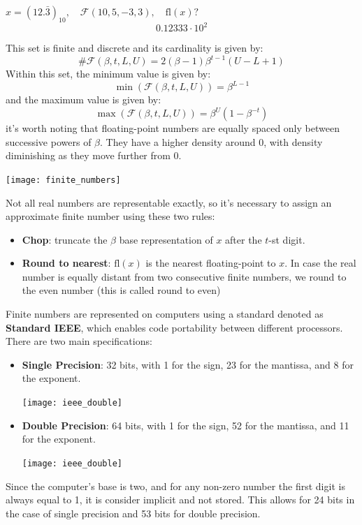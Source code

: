 \documentclass{article}
\begin{document}
\begin{example}
    $x=(12.\bar{3})_{10},\quad\mathcal{F}(10,5,-3,3),\quad \text{fl}(x)?$
    $$0.12333\cdot10^2$$
\end{example}
This set is finite and discrete and its cardinality is given by:
$$\#\mathcal{F}(\beta,t,L,U)=2(\beta-1)\beta^{t-1}(U-L+1)$$
Within this set, the minimum value is given by:
$$\min(\mathcal{F}(\beta,t,L,U))=\beta^{L-1}$$
and the maximum value is given by:
$$\max(\mathcal{F}(\beta,t,L,U))=\beta^U(1-\beta^{-t})$$
it's worth noting that floating-point numbers are equally spaced only between
successive powers of $\beta$. They have a higher density around 0, with
density diminishing as they move further from 0.
\begin{example}
   \begin{center}
       \texttt{[image: finite\_numbers]}
   \end{center} 
\end{example}
Not all real numbers are representable exactly, so it's necessary to assign an
approximate finite number using these two rules:
\begin{itemize}
    \item \textbf{Chop}: truncate the $\beta$ base representation of $x$ after
        the $t$-st digit.
    \item \textbf{Round to nearest}: $\text{fl}(x)$ is the nearest
        floating-point to $x$. In case the real number is equally distant from
        two consecutive finite numbers, we round to the even number (this is
        called round to even)
\end{itemize}
Finite numbers are represented on computers using a standard denoted as \textbf{Standard IEEE}, 
which enables code portability between different processors. There are two
main specifications:
\begin{itemize}
    \item \textbf{Single Precision}: 32 bits, with 1 for the sign, 23 for the
        mantissa, and 8 for the exponent.
        \begin{center}
            \texttt{[image: ieee\_double]}
        \end{center}
    \item \textbf{Double Precision}: 64 bits, with 1 for the sign, 52 for the
        mantissa, and 11 for the exponent.
        \begin{center}
            \texttt{[image: ieee\_double]}
        \end{center}
\end{itemize}
Since the computer's base is two, and for any non-zero number the first digit
is always equal to 1, it is consider implicit and not stored. This allows for
24 bits in the case of single precision and 53 bits for double precision.
\end{document}

